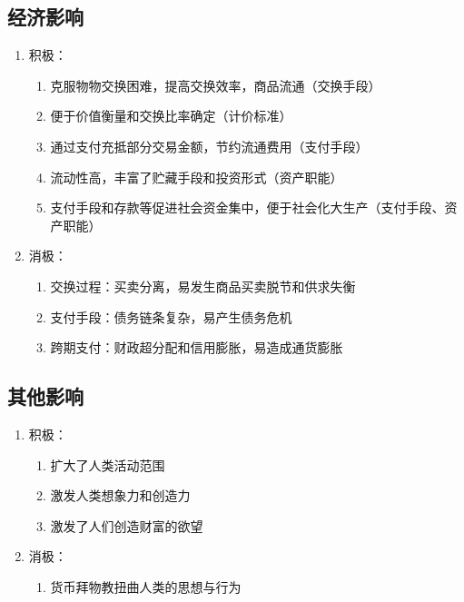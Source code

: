 \documentclass[12pt]{book}
\begin{document}
\subsection{经济影响}

\begin{enumerate}[1.]
    \item 积极：
          \begin{enumerate}[(1)]
              \item 克服物物交换困难，提高交换效率，商品流通（交换手段）
              \item 便于价值衡量和交换比率确定（计价标准）
              \item 通过支付充抵部分交易金额，节约流通费用（支付手段）
              \item 流动性高，丰富了贮藏手段和投资形式（资产职能）
              \item 支付手段和存款等促进社会资金集中，便于社会化大生产（支付手段、资产职能）
          \end{enumerate}
    \item 消极：
          \begin{enumerate}[(1)]
              \item 交换过程：买卖分离，易发生商品买卖脱节和供求失衡
              \item 支付手段：债务链条复杂，易产生债务危机
              \item 跨期支付：财政超分配和信用膨胀，易造成通货膨胀
          \end{enumerate}
\end{enumerate}



\subsection{其他影响}

\begin{enumerate}[1.]
    \item 积极：
          \begin{enumerate}[(1)]
              \item 扩大了人类活动范围
              \item 激发人类想象力和创造力
              \item 激发了人们创造财富的欲望
          \end{enumerate}
    \item 消极：
          \begin{enumerate}[(1)]
              \item 货币拜物教扭曲人类的思想与行为
          \end{enumerate}
\end{enumerate}
\end{document}
